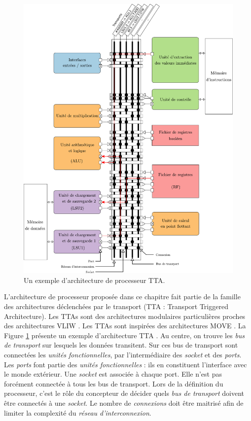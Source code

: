 \begin{figure}[htp]
\centering
\includegraphics[width=\textwidth]{main/ch4_fig/archi_tta}
\caption{Un exemple d'architecture de processeur TTA.}
\label{fig:tta_example}
\end{figure}

L'architecture de processeur proposée dans ce chapitre fait partie de la famille des architectures déclenchées par le transport (TTA : Transport Triggered Architecture). Les TTAs sont des architectures modulaires particulières proches des architectures VLIW \cite{corporaal_microprocessor_1997}. Les TTAs sont inspirées des architectures MOVE \cite{1051344}. La Figure \ref{fig:tta_example} présente un exemple d'architecture TTA \cite{pekka_phd_2012}. Au centre, on trouve les \textit{bus de transport} sur lesquels les données transitent. Sur ces bus de transport sont connectées les \textit{unités fonctionnelles}, par l'intermédiaire des \textit{socket} et des \textit{ports}. Les \textit{ports} font partie des \textit{unités fonctionnelles} : ils en constituent l'interface avec le monde extérieur. Une \textit{socket} est associée à chaque port. Elle n'est pas forcément connectée à tous les bus de transport. Lors de la définition du processeur, c'est le rôle du concepteur de décider quels \textit{bus de transport} doivent être connectés à une \textit{socket}. Le nombre de \textit{connexions} doit être maitrisé afin de limiter la complexité du \textit{réseau d'interconnexion}.

